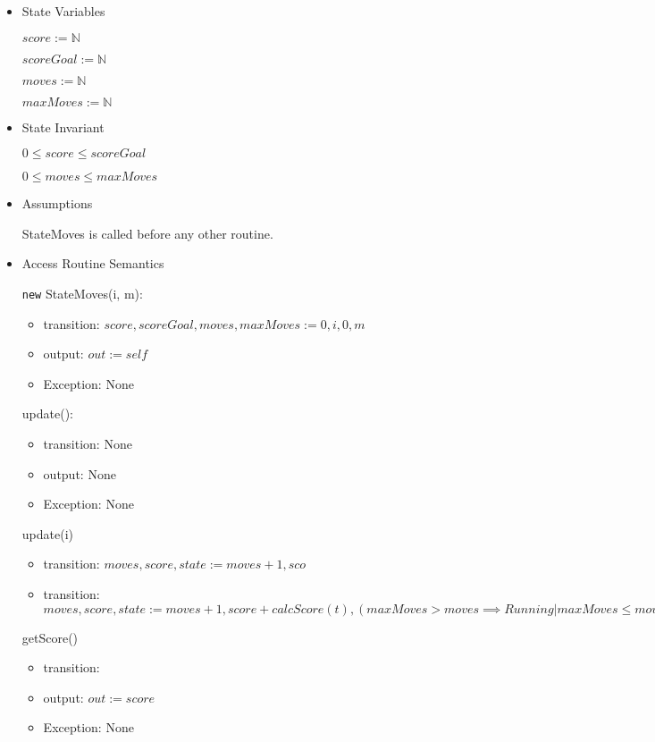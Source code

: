 \documentclass[11pt]{article}
\begin{document}
\begin{itemize}
\item State Variables
\label{sec:org155dab1}

\(score := \mathbb{N}\)

\(scoreGoal := \mathbb{N}\)

\(moves := \mathbb{N}\)

\(maxMoves := \mathbb{N}\)

\item State Invariant
\label{sec:orgc10724f}

\(0 \leq score \leq scoreGoal\)

\(0 \leq moves \leq maxMoves\)

\item Assumptions
\label{sec:org9f59215}

StateMoves is called before any other routine.

\item Access Routine Semantics
\label{sec:org0ef88c7}

\texttt{new} StateMoves(i, m):
\begin{itemize}
\item transition: \(score, scoreGoal, moves, maxMoves := 0, i, 0, m\)
\item output: \(out := self\)
\item Exception: None
\end{itemize}

update():
\begin{itemize}
\item transition: None
\item output: None
\item Exception: None
\end{itemize}

update(i)
\begin{itemize}
\item transition: \(moves, score, state := moves + 1, sco\)
\item transition: \(moves, score, state := moves + 1, score + calcScore(t), (maxMoves > moves \implies Running | maxMoves \leq moves \implies (score \geq scoreGoal \implies Win|True \implies Lose))\)
\end{itemize}

getScore()
\begin{itemize}
\item transition:
\item output: \(out := score\)
\item Exception: None
\end{itemize}


\end{itemize}
\end{document}
